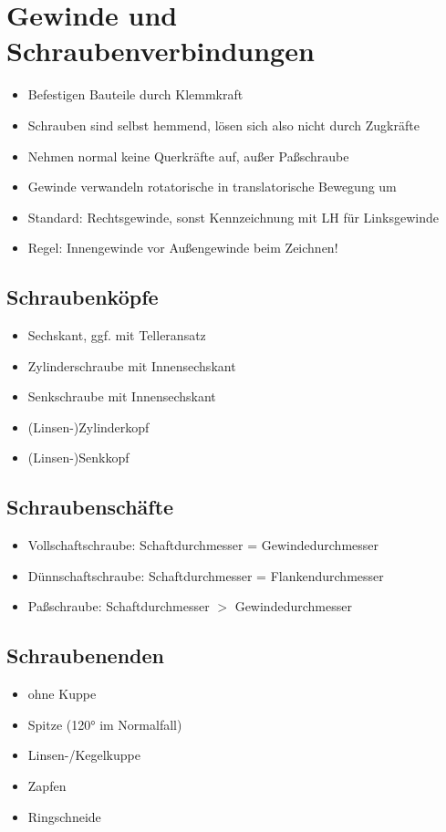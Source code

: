 \documentclass[a4paper,parskip=half*,DIV=7,fontsize=11pt]{scrartcl}
\begin{document}
\section{Gewinde und Schraubenverbindungen}
\begin{itemize}
	\item Befestigen Bauteile durch Klemmkraft
	\item Schrauben sind selbst hemmend, lösen sich also nicht durch Zugkräfte
	\item Nehmen normal keine Querkräfte auf, außer Paßschraube
	\item Gewinde verwandeln rotatorische in translatorische Bewegung um
	\item Standard: Rechtsgewinde, sonst Kennzeichnung mit LH für Linksgewinde
	\item Regel: Innengewinde vor Außengewinde beim Zeichnen!
\end{itemize}
		
\subsection{Schraubenköpfe}
\begin{itemize}
	\item Sechskant, ggf. mit Telleransatz
	\item Zylinderschraube mit Innensechskant
	\item Senkschraube mit Innensechskant
	\item (Linsen-)Zylinderkopf
	\item (Linsen-)Senkkopf
\end{itemize}
	
\subsection{Schraubenschäfte}
\begin{itemize}
	\item Vollschaftschraube: Schaftdurchmesser =
	      Gewindedurchmesser 
	\item Dünnschaftschraube: Schaftdurchmesser =
	      Flankendurchmesser 
	\item Paßschraube: Schaftdurchmesser $>$ Gewindedurchmesser 
\end{itemize}
	
\subsection{Schraubenenden}
\begin{itemize}
	\item ohne Kuppe
	\item Spitze (120° im Normalfall)
	\item Linsen-/Kegelkuppe
	\item Zapfen
	\item Ringschneide
\end{itemize}
	
\end{document}
